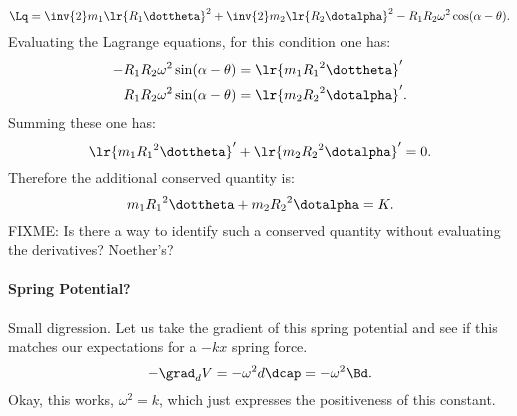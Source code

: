 {%
\begin{equation}\label{eqn:tongMf1:2200}
\Lq = \inv{2} m_1
\lr{ R_1 \dottheta }^2 +\inv{2} m_2
\lr{ R_2 \dotalpha }^2
- R_1 R_2 \omega^2 \cos(\alpha - \theta).
\end{equation}
%
Evaluating the Lagrange equations, for this condition one has:
%
\begin{equation}\label{eqn:tongMf1:840}
\begin{aligned}
-R_1 R_2 \omega^2 \sin(\alpha - \theta) &=
\lr{ m_1 {R_1}^2 \dottheta }' \\
R_1 R_2 \omega^2 \sin(\alpha - \theta) &=
\lr{ m_2 {R_2}^2 \dotalpha }'.
\end{aligned}
\end{equation}
%
Summing these one has:
\begin{equation}\label{eqn:tongMf1:2220}
\lr{ m_1 {R_1}^2 \dottheta }'
 + \lr{ m_2 {R_2}^2 \dotalpha }' = 0.
\end{equation}
%
Therefore the additional conserved quantity is:
\begin{equation}\label{eqn:tongMf1:2240}
m_1 {R_1}^2 \dottheta + m_2 {R_2}^2 \dotalpha = K.
\end{equation}
%
FIXME: Is there a way to identify such a conserved quantity without evaluating the derivatives?  Noether's?
%
\paragraph{Spring Potential?}
%
Small digression.  Let us take the gradient of this spring potential and see if this matches our expectations for a \(-kx\) spring force.
%
\begin{equation}\label{eqn:tongMf1:2260}
-{\grad}_d V = -\omega^2 d \dcap = -\omega^2 \Bd.
\end{equation}
%
Okay, this works, \(\omega^2 = k\), which just expresses the positiveness of this constant.
}
%
